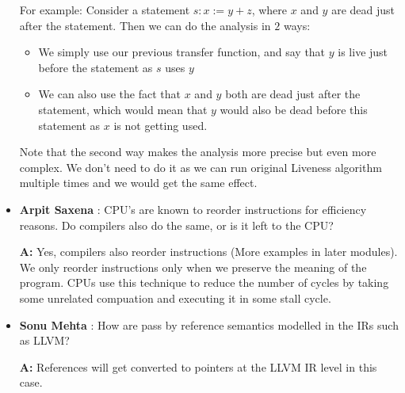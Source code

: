 \begin{itemize}
                    For example: Consider a statement $s: x := y + z$, where $x$ and $y$ are dead just after the statement. Then we can do the analysis in $2$ ways:
                    \begin{itemize}
                        \item We simply use our previous transfer function, and say that $y$ is live just before the statement as $s$ uses $y$
                        \item We can also use the fact that $x$ and $y$ both are dead just after the statement, which would mean that $y$ would also be dead before this statement as $x$ is not getting used.
                    \end{itemize}
                    Note that the second way makes the analysis more precise but even more complex. We don't need to do it as we can run original Liveness algorithm multiple times and we would get the same effect.

    \item \textbf{Arpit Saxena} : CPU's are known to reorder instructions for efficiency reasons. Do compilers also do the same, or is it left to the CPU?
            
            \textbf{A:} Yes, compilers also reorder instructions (More examples in later modules). We only reorder instructions only when we preserve the meaning of the program. CPUs use this technique to reduce the number of cycles by taking some unrelated compuation and executing it in some stall cycle.

    \item \textbf{Sonu Mehta} : How are pass by reference semantics modelled in the IRs such as LLVM?
                    
            \textbf{A:} References will get converted to pointers at the LLVM IR level in this case.

\end{itemize}
\clearpage